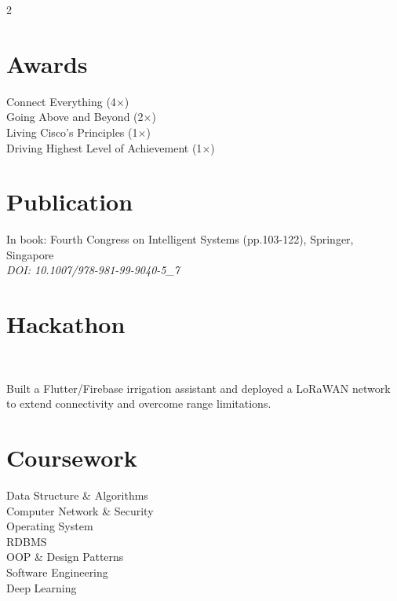 \documentclass[]{hieudo-build}
\begin{document}
\begin{paracol}{2}
\section{Awards} 
Connect Everything (4$\times$) \\
Going Above and Beyond (2$\times$) \\
Living Cisco's Principles (1$\times$) \\
Driving Highest Level of Achievement (1$\times$) \\
\sectionsep

\newpage

\section{Publication}
In book: Fourth Congress on Intelligent Systems (pp.103-122), Springer, Singapore\\
\textit{DOI: 10.1007/978-981-99-9040-5\_7}
\sectionsep

\section{Hackathon}

\\

\begin{tightemize}
\item Built a Flutter/Firebase irrigation assistant and deployed a LoRaWAN network to extend connectivity and overcome range limitations.
\end{tightemize}
\sectionsep

\section{Coursework}
Data Structure \& Algorithms \\
Computer Network \& Security \\
Operating System \\ 
RDBMS \\
OOP \& Design Patterns \\ 
Software Engineering \\ 
Deep Learning \\


\end{paracol}
\end{document}
